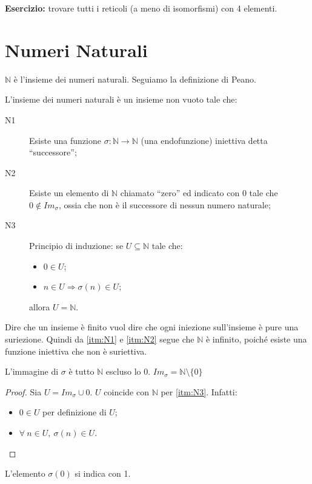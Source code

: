 \textbf{Esercizio:} trovare tutti i reticoli (a meno di isomorfismi) con 4 elementi.

\vspace{5cm}

\section{Numeri Naturali}

$\mathbb{N}$ \`e l'insieme dei numeri naturali. Seguiamo la definizione di Peano.
\begin{defn}
L'insieme dei numeri naturali \`e un insieme non vuoto tale che:
\begin{description}
  \item[N1\label{itm:N1}] Esiste una funzione $\sigma : \mathbb{N} \to \mathbb{N}$ (una endofunzione) iniettiva detta ``successore'';
  \item[N2\label{itm:N2}] Esiste un elemento di $\mathbb{N}$ chiamato ``zero'' ed indicato con 0 tale che $0 \notin Im_{\sigma}$, ossia che non \`e il successore di nessun numero naturale;
  \item[N3\label{itm:N3}] Principio di induzione: se $U \subseteq \mathbb{N}$ tale che:
  \begin{itemize}
    \item $0 \in U$;
    \item $n \in U \Rightarrow \sigma(n) \in U$;
  \end{itemize}
  allora $U = \mathbb{N}$.
\end{description}
\end{defn}
Dire che un insieme \`e finito vuol dire che ogni iniezione sull'insieme \`e pure una suriezione. Quindi da \ref{itm:N1} e \ref{itm:N2} segue che $\mathbb{N}$ \`e infinito, poich\'e esiste una funzione iniettiva che non \`e suriettiva.
\begin{prop}
L'immagine di $\sigma$ \`e tutto $\mathbb{N}$ escluso lo 0. $Im_{\sigma} = \mathbb{N} \setminus \{ 0 \}$
\end{prop}
\begin{proof}
Sia $U = Im_{\sigma} \cup 0$. $U$ coincide con $\mathbb{N}$ per \ref{itm:N3}. Infatti:
\begin{itemize}
  \item $0 \in U$ per definizione di $U$;
  \item $\forall \ n \in U, \ \sigma(n) \in U$.
\end{itemize}
\end{proof}
L'elemento $\sigma(0)$ si indica con 1.

